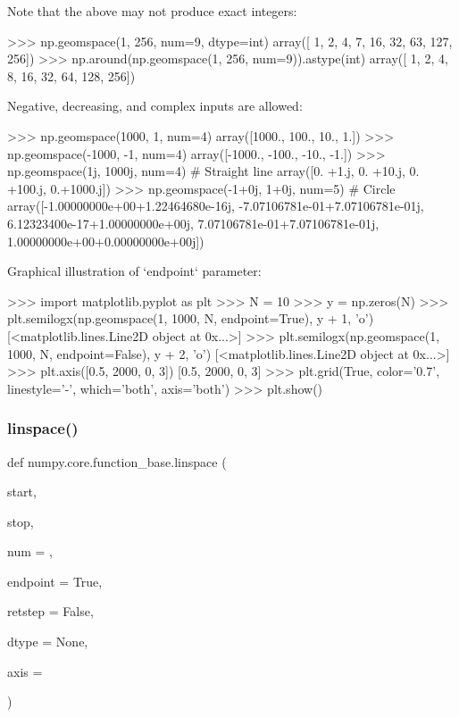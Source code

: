 \begin{DoxyVerb}
Note that the above may not produce exact integers:

>>> np.geomspace(1, 256, num=9, dtype=int)
array([  1,   2,   4,   7,  16,  32,  63, 127, 256])
>>> np.around(np.geomspace(1, 256, num=9)).astype(int)
array([  1,   2,   4,   8,  16,  32,  64, 128, 256])

Negative, decreasing, and complex inputs are allowed:

>>> np.geomspace(1000, 1, num=4)
array([1000.,  100.,   10.,    1.])
>>> np.geomspace(-1000, -1, num=4)
array([-1000.,  -100.,   -10.,    -1.])
>>> np.geomspace(1j, 1000j, num=4)  # Straight line
array([0.   +1.j, 0.  +10.j, 0. +100.j, 0.+1000.j])
>>> np.geomspace(-1+0j, 1+0j, num=5)  # Circle
array([-1.00000000e+00+1.22464680e-16j, -7.07106781e-01+7.07106781e-01j,
        6.12323400e-17+1.00000000e+00j,  7.07106781e-01+7.07106781e-01j,
        1.00000000e+00+0.00000000e+00j])

Graphical illustration of `endpoint` parameter:

>>> import matplotlib.pyplot as plt
>>> N = 10
>>> y = np.zeros(N)
>>> plt.semilogx(np.geomspace(1, 1000, N, endpoint=True), y + 1, 'o')
[<matplotlib.lines.Line2D object at 0x...>]
>>> plt.semilogx(np.geomspace(1, 1000, N, endpoint=False), y + 2, 'o')
[<matplotlib.lines.Line2D object at 0x...>]
>>> plt.axis([0.5, 2000, 0, 3])
[0.5, 2000, 0, 3]
>>> plt.grid(True, color='0.7', linestyle='-', which='both', axis='both')
>>> plt.show()\end{DoxyVerb}
 \mbox{\label{namespacenumpy_1_1core_1_1function__base_a862c72ee6263594acd4800a760179c42}} 
\subsubsection{\texorpdfstring{linspace()}{linspace()}}
{\footnotesize\ttfamily def numpy.\+core.\+function\+\_\+base.\+linspace (\begin{DoxyParamCaption}\item[{}]{start,  }\item[{}]{stop,  }\item[{}]{num = {},  }\item[{}]{endpoint = {\ttfamily True},  }\item[{}]{retstep = {\ttfamily False},  }\item[{}]{dtype = {\ttfamily None},  }\item[{}]{axis = {} }\end{DoxyParamCaption})}

